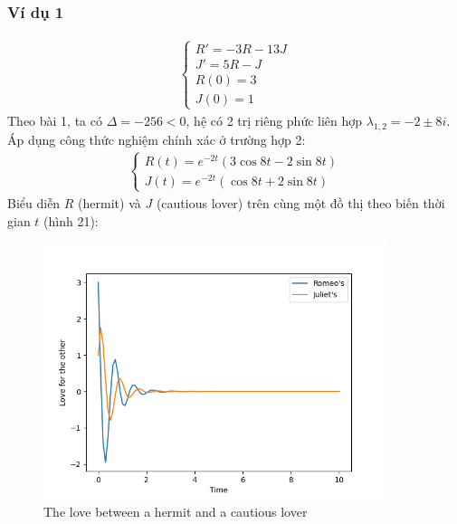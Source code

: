 \subsubsection{Ví dụ 1}
\begin{align*}
    \begin{cases}
        R'=-3R-13J\\
        J'=5R-J\\
        R(0)=3\\
        J(0)=1
    \end{cases}
\end{align*}
Theo bài 1, ta có $\Delta=-256<0$, hệ có 2 trị riêng phức liên hợp $\lambda_{1,2}=-2\pm8i$. Áp dụng công thức nghiệm chính xác ở trường hợp 2:
\begin{align*}
    \begin{cases}
        R(t)=e^{-2t}(3\cos{8t}-2\sin{8t})\\
        J(t)=e^{-2t}(\cos{8t}+2\sin{8t})
    \end{cases}
\end{align*}
Biểu diễn $R$ (hermit) và $J$ (cautious lover) trên cùng một đồ thị theo biến thời gian $t$ (hình 21):
\begin{figure}[h!]
    \begin{center}
    \includegraphics[width=10cm]{images/hermit_1.png}
    \end{center}
    \caption{The love between a hermit and a cautious lover}
\end{figure}
